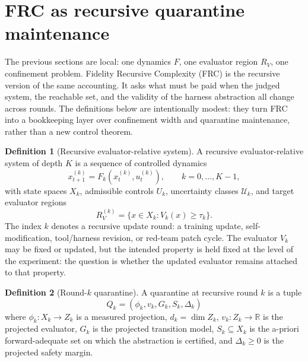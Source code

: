 \documentclass[11pt]{article}
\theoremstyle{definition}
\newtheorem{definition}{Definition}[section]
\theoremstyle{remark}
\newcommand{\RV}{R_V}
\begin{document}
\section{FRC as recursive quarantine maintenance}

The previous sections are local: one dynamics $F$, one evaluator region $\RV$, one confinement problem. Fidelity Recursive Complexity (FRC) is the recursive version of the same accounting. It asks what must be paid when the judged system, the reachable set, and the validity of the harness abstraction all change across rounds. The definitions below are intentionally modest: they turn FRC into a bookkeeping layer over confinement width and quarantine maintenance, rather than a new control theorem.

\begin{definition}[Recursive evaluator-relative system]
A recursive evaluator-relative system of depth $K$ is a sequence of controlled dynamics
\begin{equation}
x^{(k)}_{t+1}=F_k(x^{(k)}_t,u^{(k)}_t),\qquad k=0,\dots,K-1,
\end{equation}
with state spaces $X_k$, admissible controls $U_k$, uncertainty classes $\mathcal U_k$, and target evaluator regions
\begin{equation}
R^{(k)}_V=\{x\in X_k: V_k(x)\ge\tau_k\}.
\end{equation}
The index $k$ denotes a recursive update round: a training update, self-modification, tool/harness revision, or red-team patch cycle. The evaluator $V_k$ may be fixed or updated, but the intended property is held fixed at the level of the experiment: the question is whether the updated evaluator remains attached to that property.
\end{definition}

\begin{definition}[Round-$k$ quarantine]
A quarantine at recursive round $k$ is a tuple
\begin{equation}
Q_k=(\phi_k,v_k,G_k,S_k,\Delta_k)
\end{equation}
where $\phi_k:X_k\to Z_k$ is a measured projection, $d_k=\dim Z_k$, $v_k:Z_k\to\mathbb R$ is the projected evaluator, $G_k$ is the projected transition model, $S_k\subseteq X_k$ is the a-priori forward-adequate set on which the abstraction is certified, and $\Delta_k\ge0$ is the projected safety margin.
\end{definition}
\end{document}
